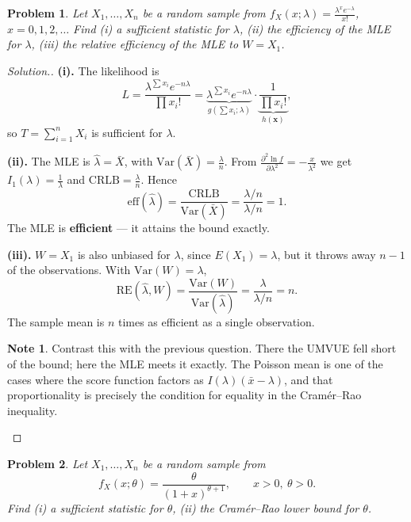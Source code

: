 \documentclass[12pt,a4paper]{report}
\theoremstyle{definition}
\newtheorem{note}[thm]{Note}
\theoremstyle{plain}
\newtheorem{problemx}{Problem}[section]
\newenvironment{problem}{\begin{problemx}}{\end{problemx}}
\newenvironment{solution}
  {\renewcommand{\qedsymbol}{}\begin{proof}[\textit{Solution}.]}
  {\end{proof}}
\begin{document}
\begin{problem}
Let $X_1,\ldots,X_n$ be a random sample from
$f_X(x;\lambda)=\frac{\lambda^xe^{-\lambda}}{x!}$, $x=0,1,2,\ldots$
Find (i) a sufficient statistic for $\lambda$, (ii) the efficiency of the MLE for
$\lambda$, (iii) the relative efficiency of the MLE to $W=X_1$.
\end{problem}

\begin{solution}
\textbf{(i).} The likelihood is
\[L=\frac{\lambda^{\sum x_i}e^{-n\lambda}}{\prod x_i!}
=\underbrace{\lambda^{\sum x_i}e^{-n\lambda}}_{g\left(\sum x_i;\lambda\right)}
\cdot\underbrace{\frac{1}{\prod x_i!}}_{h(\mathbf{x})},\]
so $T=\sum_{i=1}^nX_i$ is sufficient for $\lambda$.

\textbf{(ii).} The MLE is $\hat\lambda=\bar X$, with
$\text{Var}\left(\bar X\right)=\frac{\lambda}{n}$. From
$\frac{\partial^2\ln f}{\partial\lambda^2}=-\frac{x}{\lambda^2}$ we get
$I_1(\lambda)=\frac{1}{\lambda}$ and $\text{CRLB}=\frac{\lambda}{n}$. Hence
\[\text{eff}\left(\hat\lambda\right)
=\frac{\text{CRLB}}{\text{Var}\left(\bar X\right)}
=\frac{\lambda/n}{\lambda/n}=1.\]
The MLE is \textbf{efficient} --- it attains the bound exactly.

\textbf{(iii).} $W=X_1$ is also unbiased for $\lambda$, since $E(X_1)=\lambda$, but
it throws away $n-1$ of the observations. With $\text{Var}(W)=\lambda$,
\[\text{RE}\left(\hat\lambda,W\right)
=\frac{\text{Var}(W)}{\text{Var}\left(\hat\lambda\right)}
=\frac{\lambda}{\lambda/n}=n.\]
The sample mean is $n$ times as efficient as a single observation.

\begin{note}
Contrast this with the previous question. There the UMVUE fell short of the bound;
here the MLE meets it exactly. The Poisson mean is one of the cases where the
score function factors as $I(\lambda)\left(\bar x-\lambda\right)$, and that
proportionality is precisely the condition for equality in the Cram\'er--Rao
inequality.
\end{note}
\end{solution}

\begin{problem}
Let $X_1,\ldots,X_n$ be a random sample from
\[f_X(x;\theta)=\frac{\theta}{(1+x)^{\theta+1}},\qquad x>0,\ \theta>0.\]
Find (i) a sufficient statistic for $\theta$, (ii) the Cram\'er--Rao lower bound
for $\theta$.
\end{problem}
\end{document}
